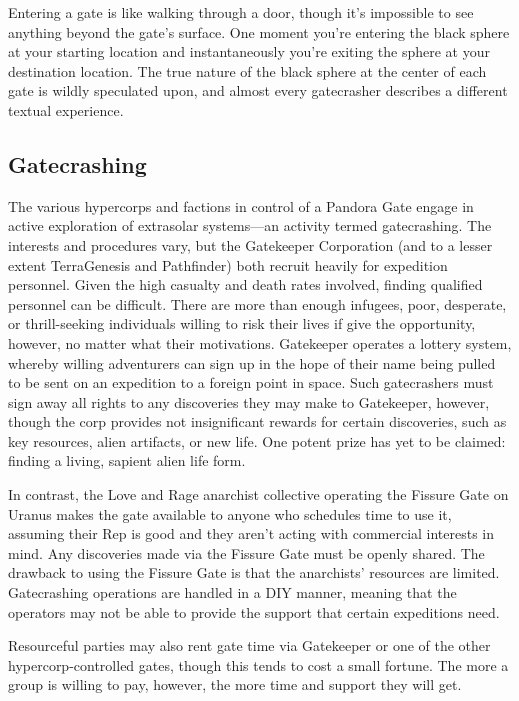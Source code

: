 Entering a gate is like walking through a door, 
though it's impossible to see anything beyond the 
gate's surface. One moment you're entering the black 
sphere at your starting location and instantaneously 
you're exiting the sphere at your destination location. 
The true nature of the black sphere at the center of 
each gate is wildly speculated upon, and almost every 
gatecrasher describes a different textual experience. 

\subsection{Gatecrashing}

The various hypercorps and factions in control of a 
Pandora Gate engage in active exploration of extrasolar
systems—an activity termed gatecrashing. The
interests and procedures vary, but the Gatekeeper 
Corporation (and to a lesser extent TerraGenesis 
and Pathfinder) both recruit heavily for expedition 
personnel. Given the high casualty and death rates 
involved, finding qualified personnel can be difficult. 
There are more than enough infugees, poor, desperate, 
or thrill-seeking individuals willing to risk their lives 
if give the opportunity, however, no matter what their 
motivations. Gatekeeper operates a lottery system, 
whereby willing adventurers can sign up in the hope 
of their name being pulled to be sent on an expedition 
to a foreign point in space. Such gatecrashers must 
sign away all rights to any discoveries they may make 
to Gatekeeper, however, though the corp provides not 
insignificant rewards for certain discoveries, such as 
key resources, alien artifacts, or new life. One potent 
prize has yet to be claimed: finding a living, sapient 
alien life form.

In contrast, the Love and Rage anarchist collective 
operating the Fissure Gate on Uranus makes the gate 
available to anyone who schedules time to use it, assuming
their Rep is good and they aren't acting with
commercial interests in mind. Any discoveries made 
via the Fissure Gate must be openly shared. The drawback
to using the Fissure Gate is that the anarchists'
resources are limited. Gatecrashing operations are 
handled in a DIY manner, meaning that the operators 
may not be able to provide the support that certain 
expeditions need.

Resourceful parties may also rent gate time via 
Gatekeeper or one of the other hypercorp-controlled 
gates, though this tends to cost a small fortune. The 
more a group is willing to pay, however, the more time 
and support they will get.

